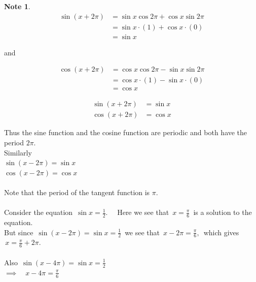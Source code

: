 \documentclass[11pt,a4paper]{article}
\theoremstyle{definition}
\newtheorem{note}[thm]{Note}
\begin{document}
\begin{note}

\begin{align*}
\sin (x + 2\pi) & = \sin x \cos 2\pi + \cos x \sin 2\pi\\
& = \sin x \cdot (1) + \cos x \cdot (0)\\
& = \sin x
\end{align*}

and

\begin{align*}
\cos (x + 2\pi) &  = \cos x\cos 2\pi - \sin x \sin 2\pi\\
& = \cos x \cdot (1) - \sin x \cdot (0)\\
& = \cos x
\end{align*}






\begin{align*}
\sin (x + 2\pi) & = \sin x\\
\cos (x + 2\pi) & = \cos x
\end{align*}



Thus the sine function and the cosine function are periodic and both have the period $2\pi$.\\

Similarly\\

$\sin (x - 2\pi) = \sin x $\\

$\cos (x - 2\pi) = \cos x$\\\\



Note that the period of the tangent function is $\pi$.\\\\


Consider the equation $\, \sin x = \frac{1}{2}.\quad $ Here we see that $\, x =  \frac{\pi}{6}\,$ is a solution to the equation.\\
But since $\, \sin ( x - 2\pi) = \sin x = \frac{1}{2}\,$ we see that $\, x - 2\pi = \frac{\pi}{6},\,$ which gives $\, x = \frac{\pi}{6} + 2\pi$.\\\\




Also $\, \sin (x - 4\pi) = \sin x = \frac{1}{2}$\\

$\implies \quad  x - 4\pi = \frac{\pi}{6}$\\


\end{note}
\end{document}

